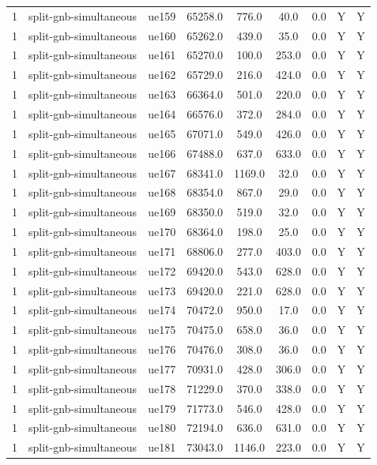 \begin{table}[ht]
\begin{tabular}{|c|c|c|c|c|c|c|c|c|}
1 & split-gnb-simultaneous & ue159 & 65258.0 & 776.0 & 40.0 & 0.0 & Y & Y \\
1 & split-gnb-simultaneous & ue160 & 65262.0 & 439.0 & 35.0 & 0.0 & Y & Y \\
1 & split-gnb-simultaneous & ue161 & 65270.0 & 100.0 & 253.0 & 0.0 & Y & Y \\
1 & split-gnb-simultaneous & ue162 & 65729.0 & 216.0 & 424.0 & 0.0 & Y & Y \\
1 & split-gnb-simultaneous & ue163 & 66364.0 & 501.0 & 220.0 & 0.0 & Y & Y \\
1 & split-gnb-simultaneous & ue164 & 66576.0 & 372.0 & 284.0 & 0.0 & Y & Y \\
1 & split-gnb-simultaneous & ue165 & 67071.0 & 549.0 & 426.0 & 0.0 & Y & Y \\
1 & split-gnb-simultaneous & ue166 & 67488.0 & 637.0 & 633.0 & 0.0 & Y & Y \\
1 & split-gnb-simultaneous & ue167 & 68341.0 & 1169.0 & 32.0 & 0.0 & Y & Y \\
1 & split-gnb-simultaneous & ue168 & 68354.0 & 867.0 & 29.0 & 0.0 & Y & Y \\
1 & split-gnb-simultaneous & ue169 & 68350.0 & 519.0 & 32.0 & 0.0 & Y & Y \\
1 & split-gnb-simultaneous & ue170 & 68364.0 & 198.0 & 25.0 & 0.0 & Y & Y \\
1 & split-gnb-simultaneous & ue171 & 68806.0 & 277.0 & 403.0 & 0.0 & Y & Y \\
1 & split-gnb-simultaneous & ue172 & 69420.0 & 543.0 & 628.0 & 0.0 & Y & Y \\
1 & split-gnb-simultaneous & ue173 & 69420.0 & 221.0 & 628.0 & 0.0 & Y & Y \\
1 & split-gnb-simultaneous & ue174 & 70472.0 & 950.0 & 17.0 & 0.0 & Y & Y \\
1 & split-gnb-simultaneous & ue175 & 70475.0 & 658.0 & 36.0 & 0.0 & Y & Y \\
1 & split-gnb-simultaneous & ue176 & 70476.0 & 308.0 & 36.0 & 0.0 & Y & Y \\
1 & split-gnb-simultaneous & ue177 & 70931.0 & 428.0 & 306.0 & 0.0 & Y & Y \\
1 & split-gnb-simultaneous & ue178 & 71229.0 & 370.0 & 338.0 & 0.0 & Y & Y \\
1 & split-gnb-simultaneous & ue179 & 71773.0 & 546.0 & 428.0 & 0.0 & Y & Y \\
1 & split-gnb-simultaneous & ue180 & 72194.0 & 636.0 & 631.0 & 0.0 & Y & Y \\
1 & split-gnb-simultaneous & ue181 & 73043.0 & 1146.0 & 223.0 & 0.0 & Y & Y \\

\end{tabular}
\end{table}
